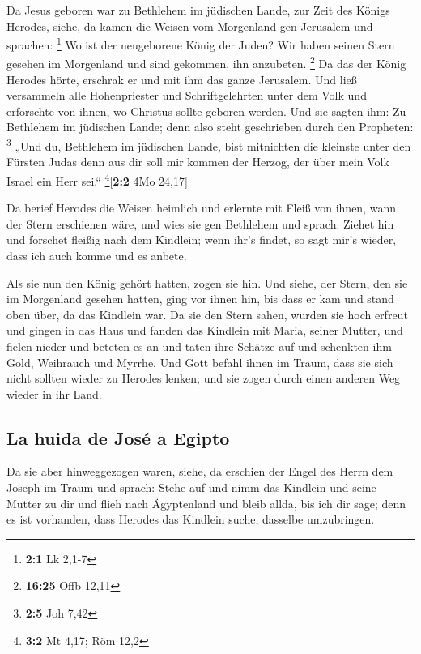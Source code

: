  Da Jesus geboren war zu Bethlehem im jüdischen Lande, zur
Zeit des Königs Herodes, siehe, da kamen die Weisen vom Morgenland gen
Jerusalem und sprachen: \footnote{\textbf{2:1} Lk 2,1-7} 
Wo ist der neugeborene König der Juden? Wir haben seinen Stern gesehen
im Morgenland und sind gekommen, ihn anzubeten. \footnote{\textbf{16:25}
  Offb 12,11}  Da das der König Herodes hörte, erschrak er
und mit ihm das ganze Jerusalem.  Und ließ versammeln alle
Hohenpriester und Schriftgelehrten unter dem Volk und erforschte von
ihnen, wo Christus sollte geboren werden.  Und sie sagten
ihm: Zu Bethlehem im jüdischen Lande; denn also steht geschrieben durch
den Propheten: \footnote{\textbf{2:5} Joh 7,42}  „Und du,
Bethlehem im jüdischen Lande, bist mitnichten die kleinste unter den
Fürsten Judas denn aus dir soll mir kommen der Herzog, der über mein
Volk Israel ein Herr sei.`` \footnote{\textbf{3:2} Mt 4,17; Röm 12,2}{[}\textbf{2:2}
4Mo 24,17{]}

 Da berief Herodes die Weisen heimlich und erlernte mit
Fleiß von ihnen, wann der Stern erschienen wäre,  und wies
sie gen Bethlehem und sprach: Ziehet hin und forschet fleißig nach dem
Kindlein; wenn ihr's findet, so sagt mir's wieder, dass ich auch komme
und es anbete.

 Als sie nun den König gehört hatten, zogen sie hin. Und
siehe, der Stern, den sie im Morgenland gesehen hatten, ging vor ihnen
hin, bis dass er kam und stand oben über, da das Kindlein war.
 Da sie den Stern sahen, wurden sie hoch erfreut
 und gingen in das Haus und fanden das Kindlein mit
Maria, seiner Mutter, und fielen nieder und beteten es an und taten ihre
Schätze auf und schenkten ihm Gold, Weihrauch und Myrrhe.
 Und Gott befahl ihnen im Traum, dass sie sich nicht
sollten wieder zu Herodes lenken; und sie zogen durch einen anderen Weg
wieder in ihr Land.

\hypertarget{la-huida-de-josuxe9-a-egipto}{%
\subsection{La huida de José a
Egipto}\label{la-huida-de-josuxe9-a-egipto}}

 Da sie aber hinweggezogen waren, siehe, da erschien der
Engel des Herrn dem Joseph im Traum und sprach: Stehe auf und nimm das
Kindlein und seine Mutter zu dir und flieh nach Ägyptenland und bleib
allda, bis ich dir sage; denn es ist vorhanden, dass Herodes das
Kindlein suche, dasselbe umzubringen.

